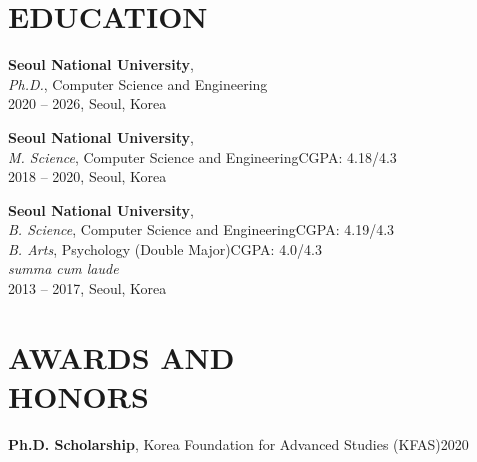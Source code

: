 \documentclass[margin]{res}
\begin{document}


\address{}%
\address{krchoe@hcil.snu.ac.kr\\(+82) 10-4043-4439\\kiroong.github.io}


\begin{resume}

\section{EDUCATION}
\textbf{Seoul National University},\\
{\sl Ph.D.}, Computer Science and Engineering\\
2020 -- 2026, Seoul, Korea

\textbf{Seoul National University},\\
{\sl M. Science}, Computer Science and Engineering\hfill CGPA: 4.18/4.3\\
2018 -- 2020, Seoul, Korea

\textbf{Seoul National University},\\
{\sl B. Science}, Computer Science and Engineering\hfill CGPA: 4.19/4.3\\
{\sl B. Arts}, Psychology (Double Major)\hfill CGPA: 4.0/4.3\\
{\sl summa cum laude}\\
2013 -- 2017, Seoul, Korea


\section{AWARDS AND\\HONORS}
\textbf{Ph.D. Scholarship}, Korea Foundation for Advanced Studies (KFAS)\hfill 2020


\end{resume}
\end{document}
